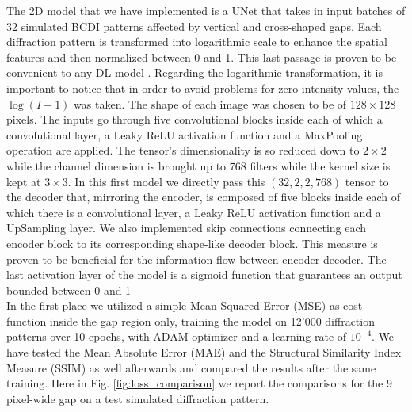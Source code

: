 The 2D model that we have implemented is a UNet that takes in input batches of 32 simulated BCDI patterns affected 
by vertical and cross-shaped gaps. Each diffraction pattern is transformed into logarithmic scale to enhance the 
spatial features and then normalized between 0 and 1. This last passage is proven to be convenient to any DL model \cite{efficientBackProp}.
Regarding the logarithmic transformation, it is important to notice that in order to avoid problems for zero intensity
values, the $\log(I+1)$ was taken.
The shape of each image was chosen to be of $128\times128$ pixels. The inputs go through five convolutional blocks 
inside each of which a convolutional layer, a Leaky ReLU activation function and a MaxPooling operation are applied. 
The tensor's dimensionality is so reduced down to $2\times2$ while the channel dimension is brought up to 768 filters 
while the kernel size is kept at $3\times3$. In this first model we directly pass this $(32,2,2,768)$ tensor to the 
decoder that, mirroring the encoder, is composed of five blocks inside each of which there is a convolutional layer,
a Leaky ReLU activation function and a UpSampling layer. We also implemented skip connections connecting each encoder block
to its corresponding shape-like decoder block. This measure is proven to be beneficial for the information flow between
encoder-decoder. The last activation layer of the model is a sigmoid function that guarantees an output bounded between 0 and 1 \\ 

In the first place we utilized a simple Mean Squared Error (MSE) as cost function inside the gap region only, training 
the model on 12'000 diffraction patterns over 10 epochs, with ADAM optimizer and a learning rate of $10^{-4}$. 
We have tested the Mean Absolute Error (MAE) and the Structural Similarity Index Measure (SSIM) \cite{ssim}
as well afterwards and compared the results after the same training.
Here in Fig. \ref{fig:loss_comparison} we report the comparisons for the 9 pixel-wide gap on a test simulated diffraction
pattern.

